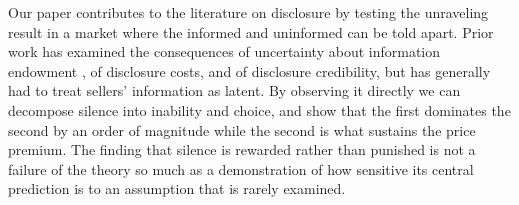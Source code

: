 Our paper contributes to the literature on disclosure by testing the unraveling result in a
market where the informed and uninformed can be told apart. Prior work has examined the
consequences of uncertainty about information endowment \citep{dye_disclosure_1985,
jung_kwon_1988}, of disclosure costs, and of disclosure credibility, but has generally had to
treat sellers' information as latent. By observing it directly we can decompose silence into
inability and choice, and show that the first dominates the second by an order of magnitude
while the second is what sustains the price premium. The finding that silence is rewarded rather
than punished is not a failure of the theory so much as a demonstration of how sensitive its
central prediction is to an assumption that is rarely examined.
